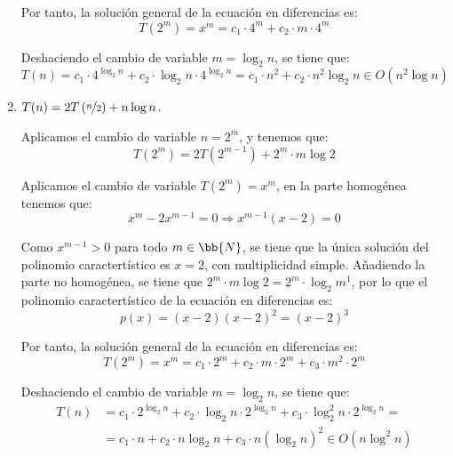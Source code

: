 \begin{ejercicio}
\begin{enumerate}[label=\alph*)]
        Por tanto, la solución general de la ecuación en diferencias es:
        \begin{equation*}
            T(2^m) = x^m = c_1\cdot 4^m + c_2\cdot m\cdot 4^m
        \end{equation*}

        Deshaciendo el cambio de variable $m=\log_2 n$, se tiene que:
        \begin{equation*}
            T(n) = c_1\cdot 4^{\log_2 n} + c_2\cdot \log_2 n\cdot 4^{\log_2 n} = c_1\cdot n^2 + c_2\cdot n^2\log_2 n \in O(n^2\log n)
        \end{equation*}

        \item $T(n)=2T\left(\nicefrac{n}{2}\right) + n\log n$.
        
        Aplicamos el cambio de variable $n=2^m$, y tenemos que:
        \begin{equation*}
            T(2^m)=2T\left(2^{m-1}\right) + 2^m\cdot m\log 2
        \end{equation*}

        Aplicamos el cambio de variable $T(2^m)=x^m$, en la parte homogénea tenemos que:
        \begin{equation*}
            x^m - 2x^{m-1} = 0 \Longrightarrow x^{m-1}(x-2)=0
        \end{equation*}

        Como $x^{m-1}>0$ para todo $m\in \bb{N}$, se tiene que la única solución del polinomio caractertístico es $x=2$,
        con multiplicidad simple. Añadiendo la parte no homogénea, se tiene que $2^m\cdot m\log 2 = 2^m\cdot \log_2 m^1$, por lo que el polinomio caractertístico
        de la ecuación en diferencias es:
        \begin{equation*}
            p(x) = (x-2)(x-2)^2 = (x-2)^3
        \end{equation*}

        Por tanto, la solución general de la ecuación en diferencias es:
        \begin{equation*}
            T(2^m) = x^m = c_1\cdot 2^m + c_2\cdot m\cdot 2^m + c_3\cdot m^2\cdot 2^m
        \end{equation*}

        Deshaciendo el cambio de variable $m=\log_2 n$, se tiene que:
        \begin{align*}
            T(n) &= c_1\cdot 2^{\log_2 n} + c_2\cdot \log_2 n\cdot 2^{\log_2 n} + c_3\cdot \log_2^2 n\cdot 2^{\log_2 n}
            =\\&= c_1\cdot n + c_2\cdot n\log_2 n + c_3\cdot n(\log_2 n)^2 \in O(n\log^2 n)
        \end{align*}


\end{enumerate}
\end{ejercicio}
